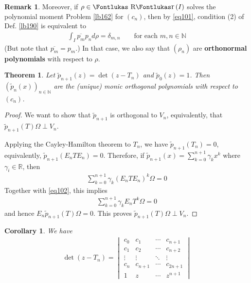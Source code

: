 \documentclass[12pt,b5paper,notitlepage]{article}
\theoremstyle{definition}
\newtheorem{rem}[df]{Remark}
\theoremstyle{plain}
\newtheorem{thm}[df]{Theorem}
\newtheorem{co}[df]{Corollary}
\DeclareMathOperator{\Rr}{\text{\Fontlukas R}\text{\kern -0pt {\Fontlukas\large r}}\,}
\newcommand{\wtd}{\widetilde}
\newcommand{\ovl}{\overline}
\newcommand{\Nbb}{\mathbb N}
\newcommand{\Rbb}{\mathbb R}
\numberwithin{equation}{section}
\begin{document}
\begin{rem}
Moreover, if $\rho\in\Rr(I)$ solves the polynomial moment Problem \ref{lb162} for $(c_n)$, then by \eqref{eq101}, condition (2) of Def. \ref{lb190} is equivalent to
\begin{align}
\int_I \ovl{p_m}p_n d\rho=\delta_{m,n}\qquad\text{for each }m,n\in\Nbb
\end{align}
(But note that $\ovl{p_m}=p_m$.) In that case, we also say that $(\rho_n)$ are \textbf{orthonormal polynomials} with respect to $\rho$.
\end{rem}



\begin{thm}\label{lb196}
Let $\wtd p_{n+1}(z)=\det(z-T_n)$ and $\wtd p_0(z)=1$. Then $(\wtd p_n(x))_{n\in\Nbb}$ are the (unique) monic orthogonal polynomials with respect to $(c_n)$.
\end{thm}

\begin{proof}
We want to show that $\wtd p_{n+1}$ is orthogonal to $V_n$, equivalently, that $\wtd p_{n+1}(T)\Omega\perp V_n$.

Applying the Cayley-Hamilton theorem to $T_n$, we have $\wtd p_{n+1}(T_n)=0$, equivalently, $\wtd p_{n+1}(E_nTE_n)=0$. Therefore, if $\wtd p_{n+1}(x)=\sum_{k=0}^{n+1} \gamma_kx^k$ where $\gamma_i\in\Rbb$, then
\begin{align*}
\sum_{k=0}^{n+1} \gamma_k (E_nTE_n)^k\Omega=0
\end{align*}
Together with \eqref{eq102}, this implies
\begin{align*}
\sum_{k=0}^{n+1} \gamma_k E_nT^k\Omega=0
\end{align*}
and hence $E_n\wtd p_{n+1}(T)\Omega=0$. This proves $\wtd p_{n+1}(T)\Omega\perp V_n$.
\end{proof}


\begin{co}
We have
\begin{align}\label{eq103}
\det(z-T_n)=
\begin{vmatrix}
c_0&c_1&\cdots&c_{n+1}\\
c_1&c_2&\cdots&c_{n+2}\\
\vdots&\vdots&\ddots&\vdots\\
c_n&c_{n+1}&\cdots&c_{2n+1}\\
1&z&\cdots& z^{n+1}
\end{vmatrix}
\end{align}
\end{co}
\end{document}
